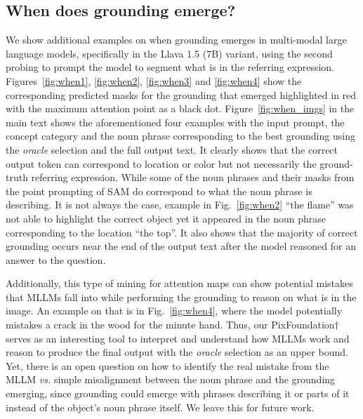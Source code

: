 \subsection{When does grounding emerge?}
We show additional examples on when grounding emerges in multi-modal large language models, specifically in the Llava 1.5 (7B) variant, using the second probing to prompt the model to segment what is in the referring expression. Figures~\ref{fig:when1}, \ref{fig:when2}, \ref{fig:when3} and \ref{fig:when4} show the corresponding predicted masks for the grounding that emerged highlighted in red with the maximum attention point as a black dot. Figure~\ref{fig:when_imgs} in the main text shows the aforementioned four examples with the input prompt, the concept category and the noun phrase corresponding to the best grounding using the \textit{oracle} selection and the full output text. It clearly shows that the correct output token can correspond to location or color but not necessarily the ground-truth referring expression. While some of the noun phrases and their masks from the point prompting of SAM do correspond to what the noun phrase is describing. It is not always the case, example in Fig.~\ref{fig:when2} ``the flame'' was not able to highlight the correct object yet it appeared in the noun phrase corresponding to the location ``the top''. It also shows that the majority of correct grounding occurs near the end of the output text after the model reasoned for an answer to the question.

Additionally, this type of mining for attention maps can show potential mistakes that MLLMs fall into while performing the grounding to reason on what is in the image. An example on that is in Fig.~\ref{fig:when4}, where the model potentially mistakes a crack in the wood for the minute hand. Thus, our PixFoundation$\dagger$ serves as an interesting tool to interpret and understand how MLLMs work and reason to produce the final output with the \textit{oracle} selection as an upper bound. Yet, there is an open question on how to identify the real mistake from the MLLM \textit{vs.} simple misalignment between the noun phrase and the grounding emerging, since grounding could emerge with phrases describing it or parts of it instead of the object's noun phrase itself. We leave this for future work.

